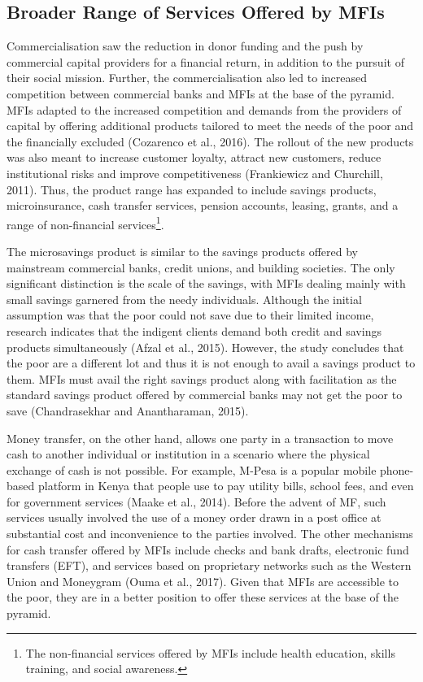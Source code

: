 \documentclass[a4paper, nobind]{templates/ociamthesis}
\begin{document}
\hypertarget{broader-range-of-services-offered-by-mfis}{%
\subsection{Broader Range of Services Offered by MFIs}\label{broader-range-of-services-offered-by-mfis}}

\noindent Commercialisation saw the reduction in donor funding and the push by commercial capital providers for a financial return, in addition to the pursuit of their social mission. Further, the commercialisation also led to increased competition between commercial banks and MFIs at the base of the pyramid. MFIs adapted to the increased competition and demands from the providers of capital by offering additional products tailored to meet the needs of the poor and the financially excluded (Cozarenco et al., 2016). The rollout of the new products was also meant to increase customer loyalty, attract new customers, reduce institutional risks and improve competitiveness (Frankiewicz and Churchill, 2011). Thus, the product range has expanded to include savings products, microinsurance, cash transfer services, pension accounts, leasing, grants, and a range of non-financial services\footnote{The non-financial services offered by MFIs include health education, skills training, and social awareness.}.

The microsavings product is similar to the savings products offered by mainstream commercial banks, credit unions, and building societies. The only significant distinction is the scale of the savings, with MFIs dealing mainly with small savings garnered from the needy individuals. Although the initial assumption was that the poor could not save due to their limited income, research indicates that the indigent clients demand both credit and savings products simultaneously (Afzal et al., 2015). However, the study concludes that the poor are a different lot and thus it is not enough to avail a savings product to them. MFIs must avail the right savings product along with facilitation as the standard savings product offered by commercial banks may not get the poor to save (Chandrasekhar and Anantharaman, 2015).

Money transfer, on the other hand, allows one party in a transaction to move cash to another individual or institution in a scenario where the physical exchange of cash is not possible. For example, M-Pesa is a popular mobile phone-based platform in Kenya that people use to pay utility bills, school fees, and even for government services (Maake et al., 2014). Before the advent of MF, such services usually involved the use of a money order drawn in a post office at substantial cost and inconvenience to the parties involved. The other mechanisms for cash transfer offered by MFIs include checks and bank drafts, electronic fund transfers (EFT), and services based on proprietary networks such as the Western Union and Moneygram (Ouma et al., 2017). Given that MFIs are accessible to the poor, they are in a better position to offer these services at the base of the pyramid.
\end{document}
